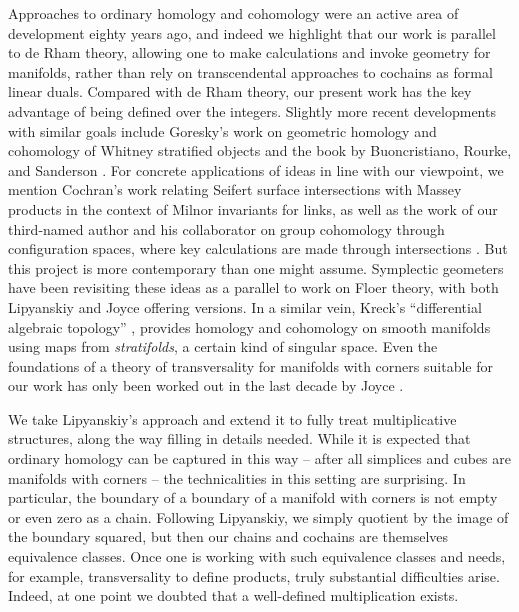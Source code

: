 Approaches to ordinary homology and cohomology were an active area of development eighty years ago, and indeed we highlight that our work is parallel to de Rham theory, allowing one to make calculations and invoke geometry for manifolds, rather than rely on transcendental approaches to cochains as formal linear duals.
Compared with de Rham theory, our present work has the key advantage of being defined over the integers.
Slightly more recent developments with similar goals include Goresky's work on geometric homology and cohomology of Whitney stratified objects \cite{goresky1981stratified} and the book by Buoncristiano, Rourke, and Sanderson \cite{buoncristiano1976homology}.
For concrete applications of ideas in line with our viewpoint, we mention Cochran's work \cite{cochran1990milnor} relating Seifert surface intersections with Massey products in the context of Milnor invariants for links, as well as the work of our third-named author and his collaborator on group cohomology through configuration spaces, where key calculations are made through intersections \cite{giusti2012symmetric, giusti2021alternating}.
But this project is more contemporary than one might assume.
Symplectic geometers have been revisiting these ideas as a parallel to work on Floer theory, with both Lipyanskiy \cite{Lipy14} and Joyce \cite{Joyc15} offering versions.
In a similar vein, Kreck's ``differential algebraic topology'' \cite{Krec10}, provides homology and cohomology on smooth manifolds using maps from \textit{stratifolds}, a certain kind of singular space.
Even the foundations of a theory of transversality for manifolds with corners suitable for our work has only been worked out in the last decade by Joyce \cite{Joy12}.

We take Lipyanskiy's approach and extend it to fully treat multiplicative structures, along the way filling in details needed.
While it is expected that ordinary homology can be captured in this way -- after all simplices and cubes are manifolds with corners -- the technicalities in this setting are surprising.
In particular, the boundary of a boundary of a manifold with corners is not empty or even zero as a chain.
Following Lipyanskiy, we simply quotient by the image of the boundary squared, but then our chains and cochains are themselves equivalence classes.
Once one is working with such equivalence classes and needs, for example, transversality to define products, truly substantial difficulties arise.
Indeed, at one point we doubted that a well-defined multiplication exists.

